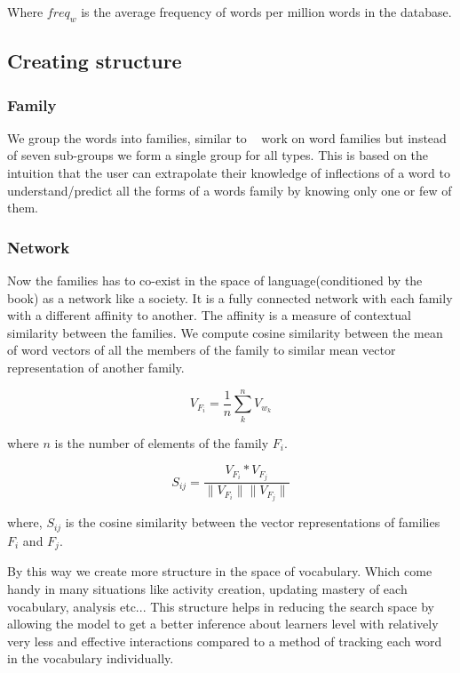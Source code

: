 \documentclass[11pt,a4paper]{article}
\begin{document}
Where ${freq_w}$ is the average frequency of words per million words in the
database.

\subsection{Creating structure}

\subsubsection{Family}
We group the words into families, similar to ~\citep{bauer1993word} work on word
families but instead of seven sub-groups we form a single group for all types.
This is based on the intuition that the user can extrapolate their knowledge of
inflections of a word to understand/predict all the forms of a words family
by knowing only one or few of them.

\subsubsection{Network}
Now the families has to co-exist in the space of language(conditioned by the
book) as a network like a society. It is a fully connected network with each
family with a different affinity to another. The affinity is a measure of
contextual similarity between the families. We compute cosine similarity 
between the mean of word vectors of all the members of the family to similar
mean vector representation of another family.

\begin{equation}
  V_{F_i} = \frac{1}{n} \sum_{k}^{n} V_{w_k}
\end{equation}

where ${n}$ is the number of elements of the family ${F_i}$.

\begin{equation}
  S_{ij} = \frac{V_{F_i} * V_{F_j}}{\|V_{F_i}\|  \|V_{F_j}\|}
\end{equation}

where, ${S_{ij}}$ is the cosine similarity between the vector representations of
families ${F_i}$ and ${F_j}$.


By this way we create more structure in the space of vocabulary. Which come
handy in many situations like activity creation, updating mastery of each
vocabulary, analysis etc... This structure helps in reducing the search space
by allowing the model to get a better inference about learners level with
relatively very less and effective interactions compared to a method of
tracking each word in the vocabulary individually.
\end{document}
